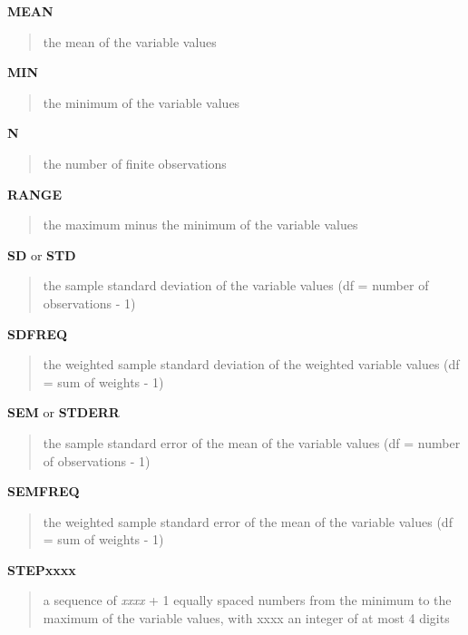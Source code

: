 \documentclass{book}
\newcommand\Texinfocommandstyletextvar[1]{{\normalfont{}\textsl{#1}}}%
\renewcommand{\_}{\Texinfounderscore\discretionary{}{}{}}
\begin{document}
\textbf{MEAN}
\begin{quote}
the mean of the variable values
\end{quote}
%

\textbf{MIN}
\begin{quote}
the minimum of the variable values
\end{quote}
%

\textbf{N}
\begin{quote}
the number of finite observations
\end{quote}
%

\textbf{RANGE}
\begin{quote}
the maximum minus the minimum of the variable values
\end{quote}
%

\textbf{SD} or \textbf{STD}
\begin{quote}
the sample standard deviation of the variable values (df = number of observations - 1)
\end{quote}
%
%

\textbf{SDFREQ}
\begin{quote}
the weighted sample standard deviation of the weighted variable values (df = sum of weights - 1)
\end{quote}
%
%

\textbf{SEM} or \textbf{STDERR}
\begin{quote}
the sample standard error of the mean of the variable values (df = number of observations - 1)
\end{quote}
%
%

\textbf{SEMFREQ}
\begin{quote}
the weighted sample standard error of the mean of the variable values (df = sum of weights - 1)
\end{quote}
%
%

\textbf{STEPxxxx}
\begin{quote}
a sequence of \Texinfocommandstyletextvar{xxxx} + 1 equally spaced numbers from the minimum
to the maximum of the variable values, with xxxx an integer of at most 4 digits
\end{quote}
%
\end{document}

